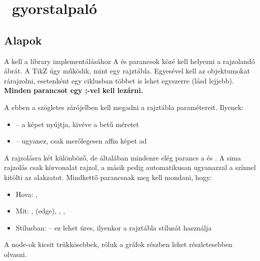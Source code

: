 \chapter{\tikzname\ gyorstalpaló}

\section{Alapok}

A \code{\usepackage{tikzpicture}} kell a library implementálásához A \code{\begin{tikzpicture}} és \code{\end{tikzpicture}} parancsok közé kell helyezni a rajzolandó ábrát. A TikZ úgy működik, mint egy rajztábla. Egyesével kell az objektumokat rárajzolni, esetenként egy ciklusban többet is lehet egyszerre (lásd lejjebb). \textbf{Minden parancsot egy  ;-vel kell lezárni.}

A \code{\begin{tikzpicture}["paraméterek"]} ebben a szögletes zárójelben kell megadni a rajztábla paramétereit. Ilyenek:
\begin{itemize}
    \item {}  -- a képet nyújtja, kivéve a betű méretet
    \item {}  -- ugyanez, csak merőlegesen affin képet ad
\end{itemize}

A rajzolásra két különböző, de általában mindenre elég parancs a \code{\draw} és \code{\filldraw} . A sima rajzolás csak körvonalat rajzol, a másik pedig automatikusan ugyanazzal a színnel kitölti az alakzatot. Mindkettő parancsnak meg kell mondani, hogy:

\begin{itemize}
    \item Hova: , 
    \item Mit: , \code{--} (edge), , , 
    \item Stílusban:  -- ez lehet üres, ilyenkor a rajztábla stílusát használja
\end{itemize}

A node-ok kicsit trükkösebbek, róluk a gráfok részben lehet részletesebben olvasni.

